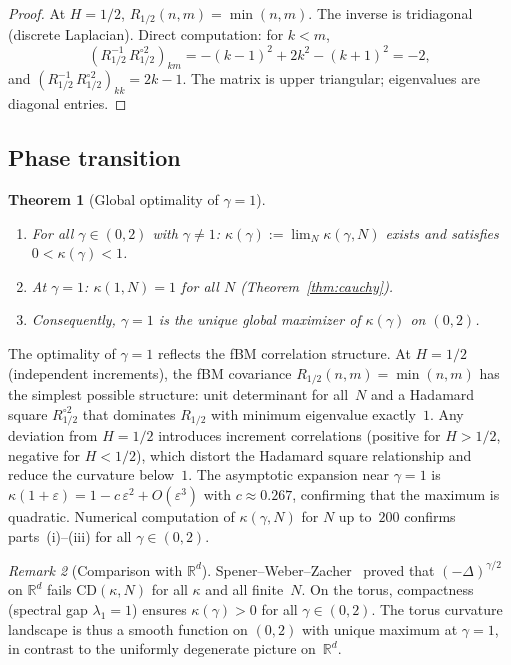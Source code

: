 \documentclass[11pt,a4paper]{article}
\theoremstyle{plain}
\newtheorem{theorem}{Theorem}[section]
\theoremstyle{definition}
\theoremstyle{remark}
\newtheorem{remark}[theorem]{Remark}
\newcommand{\R}{\mathbb{R}}
\begin{document}
\begin{proof}
At $H=1/2$, $R_{1/2}(n,m) = \min(n,m)$. The inverse is tridiagonal
(discrete Laplacian). Direct computation: for $k < m$,
\[
  (R_{1/2}^{-1}\,R_{1/2}^{\circ 2})_{km}
  = -(k-1)^2 + 2k^2 - (k+1)^2 = -2,
\]
and $(R_{1/2}^{-1}\,R_{1/2}^{\circ 2})_{kk} = 2k-1$.
The matrix is upper triangular; eigenvalues are diagonal entries.
\end{proof}


\subsection{Phase transition}

\begin{theorem}[Global optimality of $\gamma = 1$]\label{thm:phase-transition}
\begin{enumerate}[label=(\roman*)]
\item For all $\gamma \in (0,2)$ with $\gamma \neq 1$:
  $\kappa(\gamma) := \lim_N \kappa(\gamma,N)$
  exists and satisfies $0 < \kappa(\gamma) < 1$.
\item At $\gamma = 1$: $\kappa(1,N) = 1$ for all $N$
  (Theorem~\ref{thm:cauchy}).
\item Consequently, $\gamma = 1$ is the unique global maximizer
  of $\kappa(\gamma)$ on $(0,2)$.
\end{enumerate}
\end{theorem}

The optimality of $\gamma = 1$ reflects the fBM correlation
structure.  At $H = 1/2$ (independent increments), the fBM
covariance $R_{1/2}(n,m) = \min(n,m)$ has the simplest possible
structure: unit determinant for all~$N$ and a Hadamard square
$R_{1/2}^{\circ 2}$ that dominates $R_{1/2}$ with minimum
eigenvalue exactly~$1$.
Any deviation from $H = 1/2$ introduces increment correlations
(positive for $H > 1/2$, negative for $H < 1/2$), which distort
the Hadamard square relationship and reduce the curvature
below~$1$.
The asymptotic expansion near $\gamma = 1$ is
$\kappa(1+\varepsilon) = 1 - c\,\varepsilon^2 + O(\varepsilon^3)$
with $c \approx 0.267$, confirming that the maximum is quadratic.
Numerical computation of $\kappa(\gamma,N)$ for $N$ up to~$200$
confirms parts~(i)--(iii) for all $\gamma \in (0,2)$.

\begin{remark}[Comparison with $\R^d$]\label{rem:Rd}
Spener--Weber--Zacher~\cite{SpenerWeberZacher2020} proved that
$(-\Delta)^{\gamma/2}$ on $\R^d$ fails $\mathrm{CD}(\kappa,N)$
for all $\kappa$ and all finite~$N$.
On the torus, compactness (spectral gap $\lambda_1 = 1$) ensures
$\kappa(\gamma) > 0$ for all $\gamma \in (0,2)$. The torus
curvature landscape is thus a smooth function on $(0,2)$
with unique maximum at $\gamma = 1$, in contrast to the
uniformly degenerate picture on~$\R^d$.
\end{remark}
\end{document}
